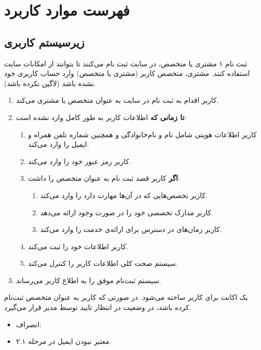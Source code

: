 \newpage
\section{فهرست موارد کاربرد}


\subsection{زیرسیستم کاربری}
\renewcommand{\labelenumiii}{\arabic{enumi}.\arabic{enumii}.\arabic{enumiii}}

{
\usecase
{ثبت نام}
{۱}
{مشتری یا متخصص، در سایت ثبت نام می‌کنند تا بتوانند از امکانات سایت استفاده کنند.}
{مشتری، متخصص}
{}{کاربر (مشتری یا متخصص) وارد حساب کاربری خود نشده باشد (لاگین نکرده باشد).}
{
\vspace*{-0.6cm}
\begin{enumerate}
	\item 
	کاربر اقدام به ثبت نام در سایت به عنوان متخصص یا مشتری می‌کند.
	\item
	\textbf{تا زمانی که} اطلاعات کاربر به طور کامل وارد نشده است:
	
	\begin{enumerate}[label=\theenumi.\arabic*.]
	\item
	کاربر اطلاعات هویتی شامل نام و نام‌خانوادگی و همچنین شماره تلفن همراه و ایمیل را وارد می‌کند.
	\item 
	کاربر رمز عبور خود را وارد می‌کند.
	
	\item 
	\textbf{اگر} کاربر قصد ثبت نام به عنوان متخصص را داشت:
	\begin{enumerate}
		\item 
		کاربر تخصص‌هایی که در آن‌ها مهارت دارد را وارد می‌کند.
			\item 
		کاربر مدارک تخصصی خود را در صورت وجود ارائه می‌دهد.
		\item 
		کاربر زمان‌های در دسترس برای ارائه‌ی خدمت را وارد می‌کند.
	\end{enumerate}

	\item 
	کاربر اطلاعات خود را ثبت می‌کند.
	
	\item 
	سیستم صحت کلی اطلاعات کاربر را کنترل می‌کند.
	\end{enumerate}
	
	\item 
	سیستم ثبت‌نام موفق را به اطلاع کاربر می‌رساند.
	
	
\end{enumerate}
}
{یک اکانت برای کاربر ساخته می‌شود. در صورتی که کاربر به عنوان متخصص ثبت‌نام کرده باشد، در وضعیت در انتظار تایید توسط مدیر قرار می‌گیرد.}
{\begin{itemize}
		\vspace*{-0.6cm}
		\item انصراف: 
		\item معتبر نبودن ایمیل در مرحله ۲.۱.
		

\end{itemize}}}
